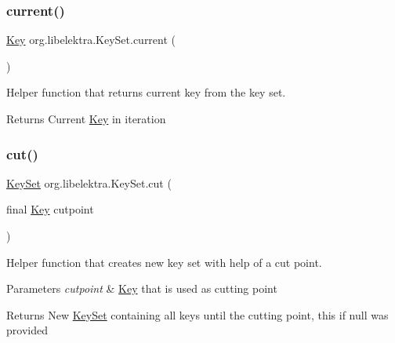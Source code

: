 \subsubsection{\texorpdfstring{current()}{current()}}
{\footnotesize\ttfamily \hyperlink{classorg_1_1libelektra_1_1Key}{Key} org.\+libelektra.\+Key\+Set.\+current (\begin{DoxyParamCaption}{ }\end{DoxyParamCaption})\hspace{0.3cm}{\ttfamily [inline]}}



Helper function that returns current key from the key set. 

\begin{DoxyReturn}{Returns}
Current \hyperlink{classorg_1_1libelektra_1_1Key}{Key} in iteration 
\end{DoxyReturn}
\mbox{\label{classorg_1_1libelektra_1_1KeySet_a470743c3a6f873427d057c6ce7e3661c}} 
\subsubsection{\texorpdfstring{cut()}{cut()}}
{\footnotesize\ttfamily \hyperlink{classorg_1_1libelektra_1_1KeySet}{Key\+Set} org.\+libelektra.\+Key\+Set.\+cut (\begin{DoxyParamCaption}\item[{final \hyperlink{classorg_1_1libelektra_1_1Key}{Key}}]{cutpoint }\end{DoxyParamCaption})\hspace{0.3cm}{\ttfamily [inline]}}



Helper function that creates new key set with help of a cut point. 


\begin{DoxyParams}{Parameters}
{\em cutpoint} & \hyperlink{classorg_1_1libelektra_1_1Key}{Key} that is used as cutting point \\
\hline
\end{DoxyParams}
\begin{DoxyReturn}{Returns}
New \hyperlink{classorg_1_1libelektra_1_1KeySet}{Key\+Set} containing all keys until the cutting point, this if null was provided 
\end{DoxyReturn}
\mbox{\label{classorg_1_1libelektra_1_1KeySet_af3571c68cd55983c45666cf9f75143a1}} 
